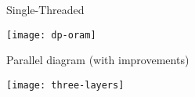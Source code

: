 \section{\epsolute}

	\begin{frame}{Single-Threaded \epsolute{}}

		\centering
		\texttt{[image: dp-oram]}

	\end{frame}


	\begin{frame}{Parallel \epsolute{} diagram (with improvements)}

		\centering
		\texttt{[image: three-layers]}

	\end{frame}
